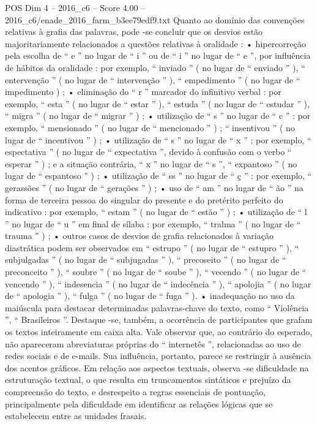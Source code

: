 \begin{textsample}{POS Dim 4 – 2016\_c6 – Score 4.00 – 2016\_c6/enade\_2016\_farm\_b3ee79edf9.txt}
Quanto ao domínio das convenções relativas à grafia das palavras, pode -se concluir que os desvios estão majoritariamente relacionados a questões relativas à oralidade : • hipercorreção pela escolha de “ e ” no lugar de “ i ” ou de “ i ” no lugar de “ e ”, por influência de hábitos da oralidade : por exemplo, “ inviado ” ( no lugar de “ enviado ” ), “ entervenção ” ( no lugar de “ intervenção ” ), “ empedimento ” ( no lugar de “ impedimento ) ; • eliminação do “ r ” marcador do infinitivo verbal : por exemplo, “ esta ” ( no lugar de “ estar ” ), “ estuda ” ( no lugar de “ estudar ” ), “ migra ” ( no lugar de “ migrar ” ) ; • utilização de “ s ” no lugar de “ c ” : por exemplo, “ mensionado ” ( no lugar de “ mencionado ” ) ; “ insentivou ” ( no lugar de “ incentivou ” ) ; • utilização de “ s ” no lugar de “ x ” : por exemplo, “ espectativa ” ( no lugar de “ expectativa ”, devido à confusão com o verbo “ esperar ” ) ; e a situação contrária, “ x ” no lugar de “ s ”, “ expantoso ” ( no lugar de “ espantoso ” ) ; • utilização de “ ss ” no lugar de “ ç ” : por exemplo, “ gerassões ” ( no lugar de “ gerações ” ) ; • uso de “ am ” no lugar de “ ão ” na forma de terceira pessoa do singular do presente e do pretérito perfeito do indicativo : por exemplo, “ estam ” ( no lugar de “ estão ” ) ; • utilização de “ l ” no lugar de “ u ” em final de sílaba : por exemplo, “ tralma ” ( no lugar de “ trauma ” ) ; • outros casos de desvios de grafia relacionados à variação diastrática podem ser observados em “ estrupo ” ( no lugar de “ estupro ” ), “ subjulgadas ” ( no lugar de “ subjugadas ” ), “ precoseito ” ( no lugar de “ preconceito ” ), “ soubre ” ( no lugar de “ soube ” ), “ vecendo ” ( no lugar de “ vencendo ” ), “ indesencia ” ( no lugar de “ indecência ” ), “ apolojia ” ( no lugar de “ apologia ” ), “ fulga ” ( no lugar de “ fuga ” ). • inadequação no uso da maiúscula para destacar determinadas palavras-chave do texto, como “ Violência ”, “ Brasileiros ”.
Destaque -se, também, a ocorrência de participantes que grafam os textos inteiramente em caixa alta.
Vale observar que, ao contrário do esperado, não apareceram abreviaturas próprias do “ internetês ”, relacionadas ao uso de redes sociais e de e-mails.
Sua influência, portanto, parece se restringir à ausência dos acentos gráficos.
Em relação aos aspectos textuais, observa -se dificuldade na estruturação textual, o que resulta em truncamentos sintáticos e prejuízo da compreensão do texto, e desrespeito a regras essenciais de pontuação, principalmente pela dificuldade em identificar as relações lógicas que se estabelecem entre as unidades frasais.

\end{textsample}
